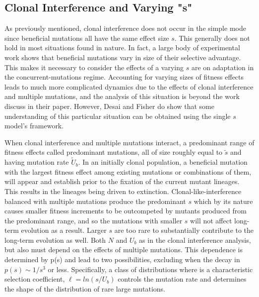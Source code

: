 \documentclass[12pt]{article}
\begin{document}
\subsection*{Clonal Interference and Varying "s"}
As previously mentioned, clonal interference does not occur in the simple mode since beneficial mutations all have the same effect size $s$.  This generally does not hold in most situations found in nature.  In fact, a large body of experimental work shows that beneficial mutations vary in size of their selective advantage.  This makes it necessary to consider the effects of a varying $s$ are on adaptation in the concurrent-mutations regime.  Accounting for varying sizes of fitness effects leads to much more complicated dynamics due to the effects of clonal interference and multiple mutations, and the analysis of this situation is beyond the work discuss in their paper.  However, Desai and Fisher do show that some understanding of this particular situation can be obtained using the single $s$ model's framework.

When clonal interference and multiple mutations interact, a predominant range of fitness effects called predominant mutations, all of size roughly equal to $\tilde{s}$ and having mutation rate $\tilde{U}_b$.  In an initially clonal population, a beneficial mutation with the largest fitness effect among existing mutations or combinations of them, will appear and establish prior to the fixation of the current mutant lineages.  This results in the lineages being driven to extinction.  Clonal-like-interference balanced with multiple mutations produce the predominant $s$ which by its nature causes smaller fitness increments to be outcompeted by mutants produced from the predominant range, and so the mutations with smaller $s$ will not affect long-term evolution as a result.  Larger $s$ are too rare to substantially contribute to the long-term evolution as well.  Both $N$ and $U_b$ as in the clonal interference analysis, but also must depend on the effects of multiple mutations.  This dependence is determined by p(s) and lead to two possibilities, excluding when the decay in $p(s) \sim 1/s^3$  or less.  Specifically, a class of distributions where is a characteristic selection coefficient, $\ell=ln(s/U_b)$ controls the mutation rate and determines the shape of the distribution of rare large mutations. 
\end{document}
